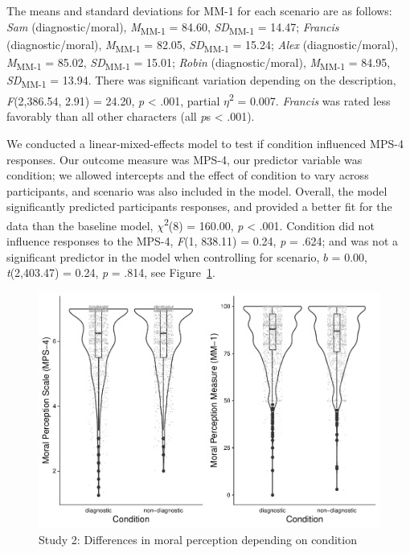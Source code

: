 \documentclass[
  english,
  man,floatsintext]{apa7}
\begin{document}
The means and standard deviations for MM-1 for each scenario are as follows:
\emph{Sam} (diagnostic/moral),
\emph{M}\textsubscript{MM-1} = 84.60, \emph{SD}\textsubscript{MM-1} = 14.47;
\emph{Francis} (diagnostic/moral),
\emph{M}\textsubscript{MM-1} = 82.05, \emph{SD}\textsubscript{MM-1} = 15.24;
\emph{Alex} (diagnostic/moral),
\emph{M}\textsubscript{MM-1} = 85.02, \emph{SD}\textsubscript{MM-1} = 15.01;
\emph{Robin} (diagnostic/moral),
\emph{M}\textsubscript{MM-1} = 84.95, \emph{SD}\textsubscript{MM-1} = 13.94. There was significant variation depending on the description, \emph{F}(2,386.54, 2.91) = 24.20, \emph{p} \textless{} .001, partial \(\eta\)\textsuperscript{2} = 0.007. \emph{Francis} was rated less favorably than all other characters (all \emph{p}s \textless{} .001).

We conducted a linear-mixed-effects model to test if condition influenced MPS-4 responses. Our outcome measure was MPS-4, our predictor variable was condition; we allowed intercepts and the effect of condition to vary across participants, and scenario was also included in the model.
Overall, the model significantly predicted participants responses, and provided a better fit for the data than the baseline model, \(\chi\)\textsuperscript{2}(8) = 160.00, \emph{p} \textless{} .001. Condition did not influence responses to the MPS-4, \emph{F}(1, 838.11) = 0.24, \emph{p} = .624; and was not a significant predictor in the model when controlling for scenario, \(b\) = 0.00, \emph{t}(2,403.47) = 0.24, \emph{p} = .814, see Figure~\ref{fig:S2bothconditionplot}.

\begin{figure}
\centering
\includegraphics{moral_dilution_in_chunks_SHORT_files/figure-latex/S2bothconditionplot-1.pdf}
\caption{\label{fig:S2bothconditionplot}Study 2: Differences in moral perception depending on condition}
\end{figure}
\end{document}
